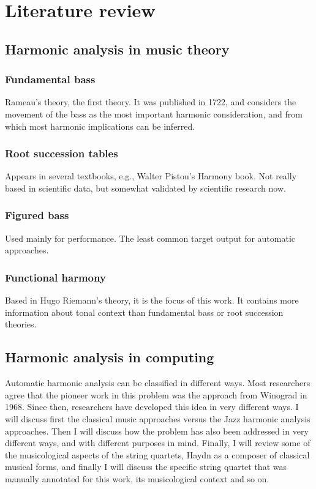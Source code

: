 \chapter{Literature review}

\section{Harmonic analysis in music theory}
  \subsection{Fundamental bass}
  Rameau's theory, the first theory. It was published in 1722, and considers the movement of the bass as the most important harmonic consideration, and from which most harmonic implications can be inferred.
  \subsection{Root succession tables}
  Appears in several textbooks, e.g., Walter Piston's Harmony book. Not really based in scientific data, but somewhat validated by scientific research now.
  \subsection{Figured bass}
  Used mainly for performance. The least common target output for automatic approaches.
  \subsection{Functional harmony}
  Based in Hugo Riemann's theory, it is the focus of this work. It contains more information about tonal context than fundamental bass or root succession theories.
\section{Harmonic analysis in computing}
  Automatic harmonic analysis can be classified in different ways. Most researchers agree that the pioneer work in this problem was the approach from Winograd in 1968. Since then, researchers have developed this idea in very different ways. I will discuss first the classical music approaches versus the Jazz harmonic analysis approaches. Then I will discuss how the problem has also been addressed in very different ways, and with different purposes in mind. Finally, I will review some of the musicological aspects of the string quartets, Haydn as a composer of classical musical forms, and finally I will discuss the specific string quartet that was manually annotated for this work, its musicological context and so on.

